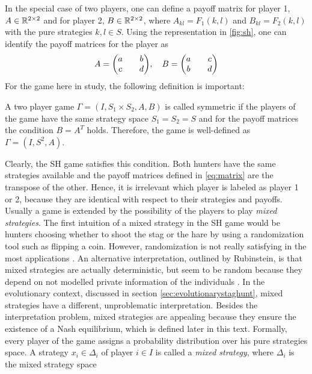 In the special case of two players, one 
can define a payoff matrix for player 1, $A \in \mathbb{R}^{2 \times2}$ and for 
player 2,  $B \in \mathbb{R}^{2 \times2}$, where $A_{kl} = F_1(k,l)$ and $
B_{kl} = F_2(k,l)$ with the pure strategies $k,l \in S$. Using the 
representation in \ref{fig:sh}, one can identify the payoff matrices for 
the player as
\begin{align}
     A = \mqty(a && b \\ c && d), \quad B = \mqty(a && c \\ b && d)
        \label{eq:matrix}
\end{align}
For the game here in study, the following definition is important: 
\begin{mydef}
        A two player game $\Gamma=(I,S_1 \times S_2, A,B)$ is called symmetric
        if the players of the game have the same strategy space $S_1=S_2=S$ and
        for the payoff matrices the condition $B=A^T$ holds. Therefore, the
        game is well-defined as $\Gamma=(I,S^2,A)$.
        \label{symmetry}
\end{mydef}
Clearly, the SH game satisfies this condition. Both hunters have the same 
strategies available and the payoff matrices defined in 
\eqref{eq:matrix}  are the transpose of the other.
Hence, it is irrelevant which player is labeled as player 1 or 2, because 
they are identical with respect to their strategies and payoffs.
Usually a game is extended by the possibility of the players to play
\textit{mixed strategies}. 
The first intuition of a mixed strategy in the SH game would be hunters
choosing whether to shoot the stag or the hare by using a randomization
tool such as flipping a coin. However, randomization is not really
satisfying in the most applications \parencite{radner_private_1982}. An
alternative interpretation, outlined by Rubinstein, is that mixed 
strategies are actually deterministic, but seem to be random because they 
depend on not modelled private information of the individuals 
\parencite[914]{rubinstein_comments_1991}. In the evolutionary context,
discussed in section \ref{sec:evolutionarystaghunt}, mixed strategies have
a different, unproblematic interpretation. Besides the interpretation problem,
mixed strategies are appealing because they ensure the existence
of a Nash equilibrium, which is defined later in this text.
Formally, every player of the game assigns a probability distribution over
his pure strategies space. A strategy $x_i \in \Delta_i$ of 
player $i \in I$ is called a \textit{mixed strategy}, where $\Delta_i$ is 
the mixed strategy space 

